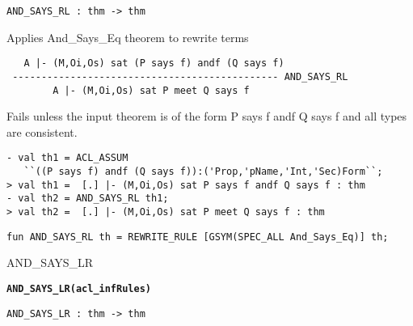 \begin{verbatim}
AND_SAYS_RL : thm -> thm
\end{verbatim}

\SYNOPSIS
Applies And_Says_Eq theorem to rewrite terms

\DESCRIBE

\begin{verbatim}
   A |- (M,Oi,Os) sat (P says f) andf (Q says f)
 ---------------------------------------------- AND_SAYS_RL
        A |- (M,Oi,Os) sat P meet Q says f
\end{verbatim}

\FAILURE Fails unless the input theorem is of the form P says f andf Q
says f and all types are consistent.

\EXAMPLE
\begin{holboxed}
\begin{verbatim}
- val th1 = ACL_ASSUM 
   ``((P says f) andf (Q says f)):('Prop,'pName,'Int,'Sec)Form``;
> val th1 =  [.] |- (M,Oi,Os) sat P says f andf Q says f : thm
- val th2 = AND_SAYS_RL th1;
> val th2 =  [.] |- (M,Oi,Os) sat P meet Q says f : thm
\end{verbatim}
\end{holboxed}
\IMPLEMENTATION
\begin{holboxed}
\begin{verbatim}
fun AND_SAYS_RL th = REWRITE_RULE [GSYM(SPEC_ALL And_Says_Eq)] th;
\end{verbatim}
\end{holboxed}

\SEEALSO
AND\_SAYS\_LR
\ENDDOC

\begin{holboxed}
  \begin{Large}
    \textbf{\texttt{AND_SAYS_LR}}\hfill{}\textbf{\texttt{(acl\_infRules)}}
  \end{Large}
\end{holboxed}

\begin{verbatim}
AND_SAYS_LR : thm -> thm
\end{verbatim}

